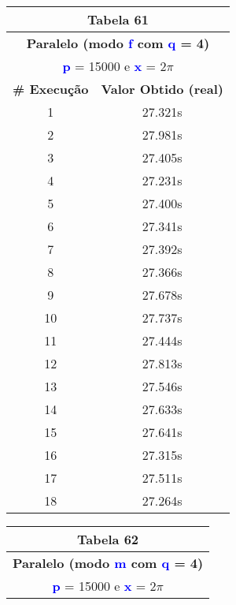 \documentclass[11pt]{article}
\begin{document}
\begin{table}[!h]
	\begin{center}
		\begin{minipage}{0.48\textwidth}
			\begin{tabular}{| c | c |}
			\hline
			\multicolumn{2}{|c|}{\textbf{Tabela 61}} \\ \hline
			\multicolumn{2}{|c|}{\textbf{Paralelo (modo \textbf{\textcolor{blue}{f}} com \textbf{\textcolor{blue}{q}} = 4)}} \\
			\multicolumn{2}{|c|}{\textbf{\textcolor{blue}{p}} = 15000 e \textbf{\textcolor{blue}{x}} = $2\pi$} \\ [0.2ex]
			\hline
				\textbf{\# Execução} &  \textbf{Valor Obtido (real)} \\ \hline
				1 & 27.321s \\ \hline
				2 & 27.981s \\ \hline
				3 & 27.405s \\ \hline
				4 & 27.231s \\ \hline
				5 & 27.400s \\ \hline
				6 & 27.341s \\ \hline
				7 & 27.392s \\ \hline
				8 & 27.366s \\ \hline
				9 & 27.678s \\ \hline
				10 & 27.737s \\ \hline
				11 & 27.444s \\ \hline
				12 & 27.813s \\ \hline
				13 & 27.546s \\ \hline
				14 & 27.633s \\ \hline
				15 & 27.641s \\ \hline
				16 & 27.315s \\ \hline
				17 & 27.511s \\ \hline
				18 & 27.264s \\ \hline
			\end{tabular}
		\end{minipage}
		\begin{minipage}{0.48\textwidth}
			\begin{tabular}{| c | c |}
			\hline
			\multicolumn{2}{|c|}{\textbf{Tabela 62}} \\ \hline
			\multicolumn{2}{|c|}{\textbf{Paralelo (modo \textbf{\textcolor{blue}{m}} com \textbf{\textcolor{blue}{q}} = 4)}} \\
			\multicolumn{2}{|c|}{\textbf{\textcolor{blue}{p}} = 15000 e \textbf{\textcolor{blue}{x}} = $2\pi$} \\ [0.2ex]

\end{tabular}
\end{minipage}
\end{center}
\end{table}
\end{document}
